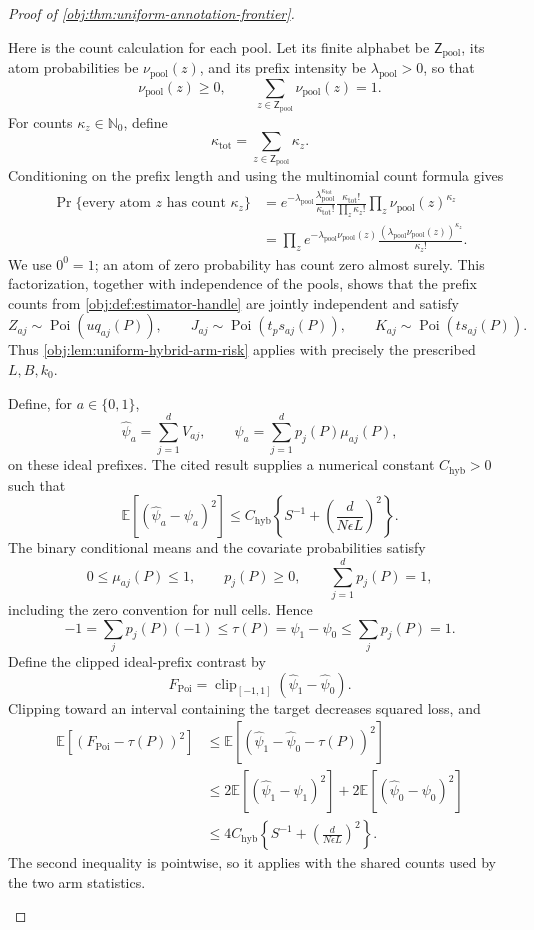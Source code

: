 \documentclass[11pt]{article}
\begin{document}
\begin{proof}[Proof of \cref{obj:thm:uniform-annotation-frontier}]
\begin{enumerate}
Here is the count calculation for each pool. Let its finite alphabet be \(\mathsf Z_{\mathrm{pool}}\), its atom probabilities be \(\nu_{\mathrm{pool}}(z)\), and its prefix intensity be \(\lambda_{\mathrm{pool}}>0\), so that
\[
\nu_{\mathrm{pool}}(z)\ge0,\qquad
\sum_{z\in\mathsf Z_{\mathrm{pool}}}\nu_{\mathrm{pool}}(z)=1.
\]
For counts \(\kappa_z\in\mathbb N_0\), define
\[
\kappa_{\mathrm{tot}}
=\sum_{z\in\mathsf Z_{\mathrm{pool}}}\kappa_z.
\]
Conditioning on the prefix length and using the multinomial count formula gives
\[
\begin{aligned}
\Pr\{\text{every atom }z\text{ has count }\kappa_z\}
&=
e^{-\lambda_{\mathrm{pool}}}
\frac{\lambda_{\mathrm{pool}}^{\kappa_{\mathrm{tot}}}}
     {\kappa_{\mathrm{tot}}!}
\frac{\kappa_{\mathrm{tot}}!}{\prod_z\kappa_z!}
\prod_z\nu_{\mathrm{pool}}(z)^{\kappa_z}\\
&=
\prod_z
e^{-\lambda_{\mathrm{pool}}\nu_{\mathrm{pool}}(z)}
\frac{(\lambda_{\mathrm{pool}}\nu_{\mathrm{pool}}(z))^{\kappa_z}}
     {\kappa_z!}.
\end{aligned}
\]
We use \(0^0=1\); an atom of zero probability has count zero almost surely. This factorization, together with independence of the pools, shows that the prefix counts from \cref{obj:def:estimator-handle} are jointly independent and satisfy
\[
Z_{aj}\sim\operatorname{Poi}(uq_{aj}(P)),\qquad
J_{aj}\sim\operatorname{Poi}(t_ps_{aj}(P)),\qquad
K_{aj}\sim\operatorname{Poi}(ts_{aj}(P)).
\]
Thus \cref{obj:lem:uniform-hybrid-arm-risk} applies with precisely the prescribed \(L,B,k_0\).

Define, for \(a\in\{0,1\}\),
\[
\widehat\psi_a=\sum_{j=1}^dV_{aj},
\qquad
\psi_a=\sum_{j=1}^dp_j(P)\mu_{aj}(P),
\]
on these ideal prefixes. The cited result supplies a numerical constant \(C_{\mathrm{hyb}}>0\) such that
\[
\mathbb E[(\widehat\psi_a-\psi_a)^2]
\le
C_{\mathrm{hyb}}
\left\{S^{-1}+\left(\frac d{N\epsilon L}\right)^2\right\}.
\]
The binary conditional means and the covariate probabilities satisfy
\[
0\le\mu_{aj}(P)\le1,\qquad
p_j(P)\ge0,\qquad
\sum_{j=1}^dp_j(P)=1,
\]
including the zero convention for null cells. Hence
\[
-1
=\sum_jp_j(P)(-1)
\le\tau(P)
=\psi_1-\psi_0
\le\sum_jp_j(P)=1.
\]
Define the clipped ideal-prefix contrast by
\[
F_{\mathrm{Poi}}
=\operatorname{clip}_{[-1,1]}(\widehat\psi_1-\widehat\psi_0).
\]
Clipping toward an interval containing the target decreases squared loss, and
\[
\begin{aligned}
\mathbb E[(F_{\mathrm{Poi}}-\tau(P))^2]
&\le
\mathbb E[(\widehat\psi_1-\widehat\psi_0-\tau(P))^2]\\
&\le
2\mathbb E[(\widehat\psi_1-\psi_1)^2]
+2\mathbb E[(\widehat\psi_0-\psi_0)^2]\\
&\le
4C_{\mathrm{hyb}}
\left\{S^{-1}+\left(\frac d{N\epsilon L}\right)^2\right\}.
\end{aligned}
\]
The second inequality is pointwise, so it applies with the shared counts used by the two arm statistics.


\end{enumerate}
\end{proof}
\end{document}
